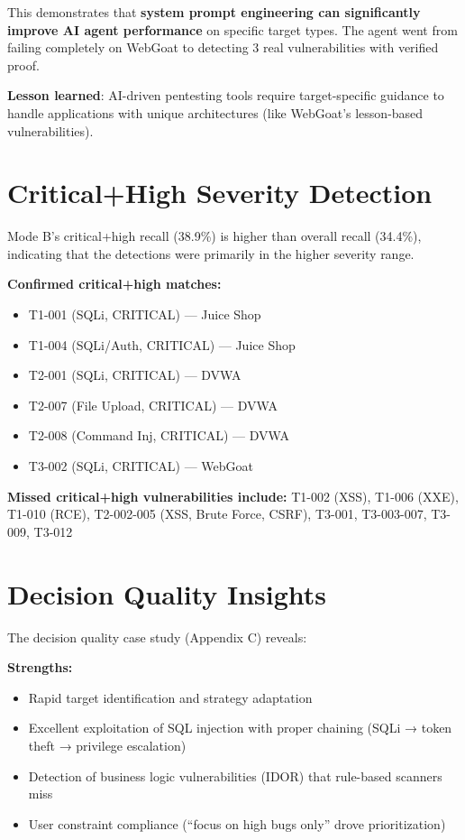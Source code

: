 \documentclass[12pt,a4paper,oneside]{book}
\begin{document}
This demonstrates that \textbf{system prompt engineering can significantly improve AI agent performance} on specific target types. The agent went from failing completely on WebGoat to detecting 3 real vulnerabilities with verified proof.

\textbf{Lesson learned}: AI-driven pentesting tools require target-specific guidance to handle applications with unique architectures (like WebGoat's lesson-based vulnerabilities).

\section{Critical+High Severity Detection}

Mode B's critical+high recall (38.9\%) is higher than overall recall (34.4\%), indicating that the detections were primarily in the higher severity range.

\textbf{Confirmed critical+high matches:}
\begin{itemize}
    \item T1-001 (SQLi, CRITICAL) — Juice Shop
    \item T1-004 (SQLi/Auth, CRITICAL) — Juice Shop
    \item T2-001 (SQLi, CRITICAL) — DVWA
    \item T2-007 (File Upload, CRITICAL) — DVWA
    \item T2-008 (Command Inj, CRITICAL) — DVWA
    \item T3-002 (SQLi, CRITICAL) — WebGoat
\end{itemize}

\textbf{Missed critical+high vulnerabilities include:} T1-002 (XSS), T1-006 (XXE), T1-010 (RCE), T2-002-005 (XSS, Brute Force, CSRF), T3-001, T3-003-007, T3-009, T3-012

\section{Decision Quality Insights}

The decision quality case study (Appendix C) reveals:

\textbf{Strengths:}
\begin{itemize}
    \item Rapid target identification and strategy adaptation
    \item Excellent exploitation of SQL injection with proper chaining (SQLi → token theft → privilege escalation)
    \item Detection of business logic vulnerabilities (IDOR) that rule-based scanners miss
    \item User constraint compliance (``focus on high bugs only'' drove prioritization)
\end{itemize}
\end{document}
